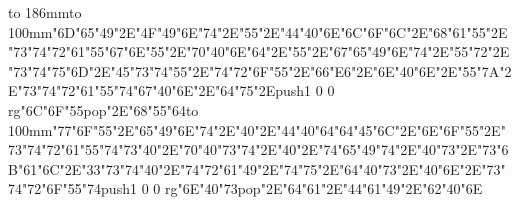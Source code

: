 \hbox to 186mm{\hsize=81mm\vbox to 100mm{\vfill\ipa\char"6D\ipa\char"65\ipa\char"49\ipa\char"2E\ipa\char"4F\ipa\char"49\ipa\char"6E\ipa\char"74\ipa\char"2E\ipa\char"55\ipa\char"2E\ipa\char"44\ipa\char"40\ipa\char"6E\medskip\ipa\char"6C\ipa\char"6F\ipa\char"6C\ipa\char"2E\ipa\char"68\ipa\char"61\ipa\char"55\ipa\char"2E\ipa\char"73\ipa\char"74\ipa\char"72\ipa\char"61\ipa\char"55\ipa\char"67\medskip\ipa\char"6E\ipa\char"55\ipa\char"2E\ipa\char"70\ipa\char"40\ipa\char"6E\ipa\char"64\ipa\char"2E\ipa\char"55\ipa\char"2E\ipa\char"67\ipa\char"65\ipa\char"49\ipa\char"6E\ipa\char"74\ipa\char"2E\ipa\char"55\ipa\char"72\ipa\char"2E\ipa\char"73\ipa\char"74\ipa\char"75\ipa\char"6D\ipa\char"2E\ipa\char"45\ipa\char"73\ipa\char"74\medskip\ipa\char"55\ipa\char"2E\ipa\char"74\ipa\char"72\ipa\char"6F\ipa\char"55\ipa\char"2E\ipa\char"66\ipa\char"E6\ipa\char"2E\ipa\char"6E\ipa\char"40\ipa\char"6E\ipa\char"2E\ipa\char"55\ipa\char"7A\ipa\char"2E\ipa\char"73\ipa\char"74\ipa\char"72\ipa\char"61\ipa\char"55\ipa\char"74\medskip\ipa\char"67\ipa\char"40\ipa\char"6E\ipa\char"2E\ipa\char"64\ipa\char"75\ipa\char"2E\pdfcolorstack\match push{1 0 0 rg}\ipa\char"6C\ipa\char"6F\ipa\char"55\pdfcolorstack\match pop{}\ipa\char"2E\ipa\char"68\ipa\char"55\ipa\char"64\vfill}\hfill\vbox to 100mm{\vfill\ipa\char"77\ipa\char"6F\ipa\char"55\ipa\char"2E\ipa\char"65\ipa\char"49\ipa\char"6E\ipa\char"74\ipa\char"2E\ipa\char"40\ipa\char"2E\ipa\char"44\ipa\char"40\ipa\char"64\medskip\ipa\char"64\ipa\char"45\ipa\char"6C\ipa\char"2E\ipa\char"6E\ipa\char"6F\ipa\char"55\ipa\char"2E\ipa\char"73\ipa\char"74\ipa\char"72\ipa\char"61\ipa\char"55\ipa\char"74\medskip\ipa\char"73\ipa\char"40\ipa\char"2E\ipa\char"70\ipa\char"40\ipa\char"73\ipa\char"74\ipa\char"2E\ipa\char"40\ipa\char"2E\ipa\char"74\ipa\char"65\ipa\char"49\ipa\char"74\ipa\char"2E\ipa\char"40\ipa\char"73\ipa\char"2E\ipa\char"73\ipa\char"6B\ipa\char"61\ipa\char"6C\ipa\char"2E\ipa\char"33\ipa\char"73\ipa\char"74\medskip\ipa\char"40\ipa\char"2E\ipa\char"74\ipa\char"72\ipa\char"61\ipa\char"49\ipa\char"2E\ipa\char"74\ipa\char"75\ipa\char"2E\ipa\char"64\ipa\char"40\ipa\char"73\ipa\char"2E\ipa\char"40\ipa\char"6E\ipa\char"2E\ipa\char"73\ipa\char"74\ipa\char"72\ipa\char"6F\ipa\char"55\ipa\char"74\medskip\pdfcolorstack\match push{1 0 0 rg}\ipa\char"6E\ipa\char"40\ipa\char"73\pdfcolorstack\match pop{}\ipa\char"2E\ipa\char"64\ipa\char"61\ipa\char"2E\ipa\char"44\ipa\char"61\ipa\char"49\ipa\char"2E\ipa\char"62\ipa\char"40\ipa\char"6E\vfill}}\eject
\bye